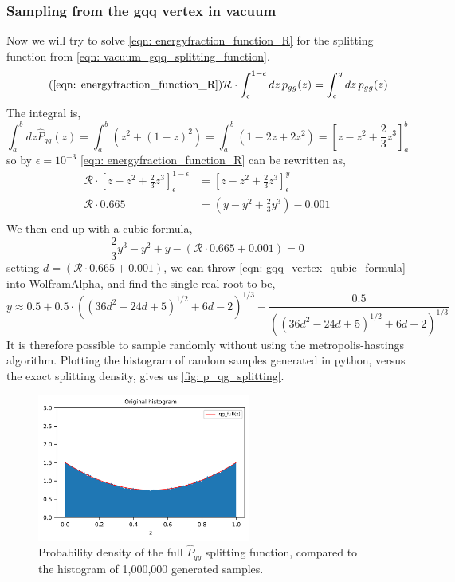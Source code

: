 \documentclass[main.tex]{subfiles}
\begin{document}
\subsubsection{Sampling from the gqq vertex in vacuum}
Now we will try to solve \autoref{eqn: energyfraction_function_R} for the \gqq splitting function from \autoref{eqn: vacuum_gqq_splitting_function}. 
\begin{equation}\tag{\ref{eqn: energyfraction_function_R}}
    \mathcal{R} \cdot \int_\epsilon^{1-\epsilon} dz \, p_{gg}(z) = \int_\epsilon^{y}dz \, p_{gg}(z)
\end{equation}
The integral is, 
\begin{equation}
    \int_a^b dz\hat{P}_{qg}(z) = \int_a^b \left(z^2 + (1-z)^2 \right) = \int_a^b \left(1-2z+2z^2 \right) = \left[ z - z^2 + \frac{2}{3} z^3 \right]_a^b
\end{equation}
so by \(\epsilon = 10^{-3}\) \autoref{eqn: energyfraction_function_R} can be rewritten as,
\begin{align}
    \mathcal{R} \cdot \left[ z - z^2 + \frac{2}{3} z^3 \right]_\epsilon^{1-\epsilon} &= \left[ z - z^2 + \frac{2}{3} z^3 \right]_\epsilon^{y} \nonumber\\
    \mathcal{R} \cdot 0.665 &= (y - y^2 + \frac{2}{3} y^3) - 0.001 \\
\end{align}
We then end up with a cubic formula, 
\begin{equation}\label{eqn: gqq_vertex_qubic_formula}
    \frac{2}{3} y^3 - y^2 + y - (\mathcal{R} \cdot 0.665+0.001) = 0
\end{equation}
setting \(d = (\mathcal{R} \cdot 0.665+0.001) \), we can throw \autoref{eqn: gqq_vertex_qubic_formula} into WolframAlpha, and find the single real root to be,
\begin{equation}\label{eqn: gqq_vacuum_sample}
    y \approx 0.5 + 0.5 \cdot((36 d^2 - 24 d + 5)^{1/2} + 6 d - 2)^{1/3} - \frac{0.5}{((36 d^2 - 24 d + 5)^{1/2} + 6 d - 2)^{1/3}}
\end{equation}
It is therefore possible to sample randomly without using the metropolis-hastings algorithm. Plotting the histogram of random samples generated in python, versus the exact splitting density, gives us \autoref{fig: p_qg_splitting}.
\begin{figure}[ht]
    \centering
    \includegraphics[width=7cm]{pictures/MH_plots/MH_vacuum_qg.png}
    \caption{Probability density of the full \(\hat{P}_{qg}\) splitting function, compared to the histogram of 1,000,000 generated samples.}
    \label{fig: p_qg_splitting}
\end{figure}
\end{document}
